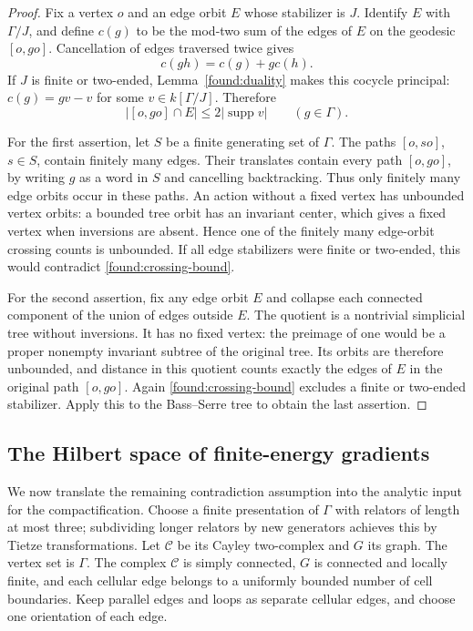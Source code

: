 \begin{proof}
Fix a vertex $o$ and an edge orbit $E$ whose stabilizer is $J$.
Identify $E$ with $\Gamma/J$, and define $c(g)$ to be the mod-two
sum of the edges of $E$ on the geodesic $[o,go]$.
Cancellation of edges traversed twice gives
\[
 c(gh)=c(g)+g c(h).
\]
If $J$ is finite or two-ended, Lemma~\ref{found:duality} makes
this cocycle principal: $c(g)=gv-v$ for some
$v\in k[\Gamma/J]$. Therefore
\begin{equation}\label{found:crossing-bound}
 |[o,go]\cap E|\leq2|\operatorname{supp}v|
 \qquad(g\in\Gamma).
\end{equation}

For the first assertion, let $S$ be a finite generating set of
$\Gamma$. The paths $[o,so]$, $s\in S$, contain finitely many
edges. Their translates contain every path $[o,go]$, by writing
$g$ as a word in $S$ and cancelling backtracking.
Thus only finitely many edge orbits occur in these paths.
An action without a fixed vertex has unbounded vertex orbits:
a bounded tree orbit has an invariant center, which gives a
fixed vertex when inversions are absent.
Hence one of the finitely many edge-orbit crossing counts is
unbounded. If all edge stabilizers were finite or two-ended,
this would contradict \eqref{found:crossing-bound}.

For the second assertion, fix any edge orbit $E$ and collapse
each connected component of the union of edges outside $E$.
The quotient is a nontrivial simplicial tree without inversions.
It has no fixed vertex: the preimage of one would be a proper
nonempty invariant subtree of the original tree.
Its orbits are therefore unbounded, and distance in this quotient
counts exactly the edges of $E$ in the original path $[o,go]$.
Again \eqref{found:crossing-bound} excludes a finite or two-ended
stabilizer. Apply this to the Bass--Serre tree to obtain the last
assertion.
\end{proof}

\subsection{The Hilbert space of finite-energy gradients}

We now translate the remaining contradiction assumption into the
analytic input for the compactification.
Choose a finite presentation of $\Gamma$ with relators of length
at most three; subdividing longer relators by new generators
achieves this by Tietze transformations.
Let $\mathcal C$ be its Cayley two-complex and $G$ its graph.
The vertex set is $\Gamma$. The complex $\mathcal C$ is simply
connected, $G$ is connected and locally finite, and each cellular
edge belongs to a uniformly bounded number of cell boundaries.
Keep parallel edges and loops as separate cellular edges, and
choose one orientation of each edge.

